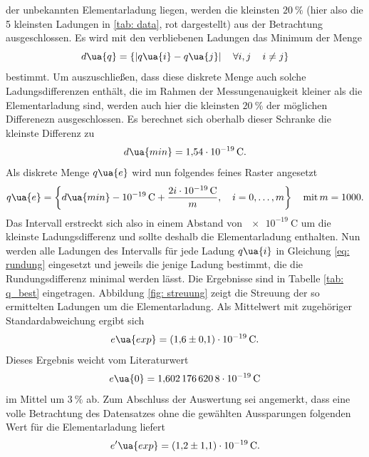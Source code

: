 der unbekannten Elementarladung liegen, werden die kleinsten $\SI{20}{\percent}$ (hier also die 5 kleinsten Ladungen in \ref{tab: data}, rot dargestellt)
aus der Betrachtung ausgeschlossen. Es wird mit den verbliebenen Ladungen das Minimum der Menge
\begin{equation}
  d\ua{q} = \left\{ \left| q\ua{i} - q\ua{j}\right| \quad \forall  i, j \, \quad i \neq j   \right\}
\end{equation}
bestimmt. Um auszuschließen, dass diese diskrete Menge auch solche Ladungsdifferenzen enthält, die im Rahmen der Messungenauigkeit
kleiner als die Elementarladung sind, werden auch hier die kleinsten $\SI{20}{\percent}$ der möglichen Differenezn ausgeschlossen.
Es berechnet sich oberhalb dieser Schranke die kleinste Differenz zu
\begin{equation}
  d\ua{min} = \SI{1.54e-19}{\coulomb}.
\end{equation}
Als diskrete Menge $q\ua{e}$ wird nun folgendes feines Raster angesetzt
\begin{equation}
  q\ua{e} = \left\{ d\ua{min} - \SI{e-19}{\coulomb}  +  \frac{2i \cdot \SI{e-19}{\coulomb}}{m}, \quad i = 0, \dots, m     \right\}\quad \text{mit} \, m = 1000.
\end{equation}
Das Intervall erstreckt sich also in einem Abstand von $\SI{e-19}{\coulomb}$ um die kleinste Ladungsdifferenz und sollte deshalb die Elementarladung enthalten.
Nun werden alle Ladungen des Intervalls für jede Ladung $q\ua{i}$ in Gleichung \eqref{eq: rundung} eingesetzt und jeweils die jenige Ladung bestimmt,
die die Rundungsdifferenz minimal werden lässt. Die Ergebnisse sind in Tabelle \ref{tab: q_best} eingetragen. Abbildung \ref{fig: streuung} zeigt die Streuung
der so ermittelten Ladungen um die Elementarladung. Als Mittelwert mit zugehöriger Standardabweichung ergibt sich
\begin{equation}
  e\ua{exp} = \SI{+1.6(1)e-19}{\coulomb}.
\end{equation}
Dieses Ergebnis weicht vom Literaturwert
\begin{equation}
  e\ua{0} = \SI{1.6021766208e-19}{\coulomb}
\end{equation}
im Mittel um $\SI{3}{\percent}$ ab. Zum Abschluss der Auswertung sei angemerkt, dass eine volle Betrachtung des Datensatzes ohne
die gewählten Aussparungen folgenden Wert für die Elementarladung liefert
\begin{equation}
   e'\ua{exp} = \SI{+1.2(11)e-19}{\coulomb}.  
\end{equation}

